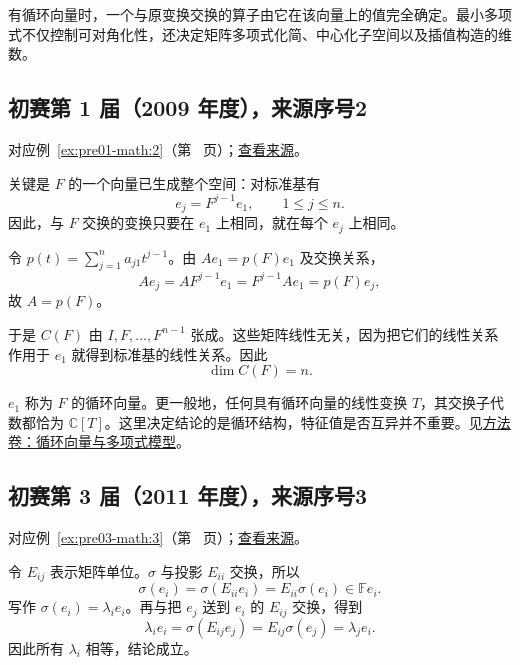 \documentclass[UTF8,12pt,a4paper,fontset=fandol]{ctexart}
\begin{document}
\label{sec:solutions-5}

有循环向量时，一个与原变换交换的算子由它在该向量上的值完全确定。最小多项式不仅控制可对角化性，还决定矩阵多项式化简、中心化子空间以及插值构造的维数。

\subsection{初赛第 1 届（2009 年度），来源序号2}\label{ans:pre01-math:2}\label{pr:pre01-math:2}

对应例~\ref{ex:pre01-math:2}（第~\pageref{ex:pre01-math:2} 页）；\href{https://github.com/lzxcr/cmc-mathematics/blob/64916fa1fdbc3e444a652eca204d5669058ee321/src/problems/preliminary/01/02.md}{查看来源}。

\begin{solve}

关键是 $F$ 的一个向量已生成整个空间：对标准基有
\[
e_j=F^{j-1}e_1,\qquad 1\le j\le n.
\]
因此，与 $F$ 交换的变换只要在 $e_1$ 上相同，就在每个 $e_j$ 上相同。

令 $p(t)=\sum_{j=1}^n a_{j1}t^{j-1}$。由 $Ae_1=p(F)e_1$ 及交换关系，
\[
Ae_j=AF^{j-1}e_1=F^{j-1}Ae_1=p(F)e_j,
\]
故 $A=p(F)$。

于是 $C(F)$ 由 $I,F,\ldots,F^{n-1}$ 张成。这些矩阵线性无关，因为把它们的线性关系作用于 $e_1$ 就得到标准基的线性关系。因此
\[
\boxed{\dim C(F)=n.}
\]

\end{solve}

\begin{remark}[方法与条件]

$e_1$ 称为 $F$ 的循环向量。更一般地，任何具有循环向量的线性变换 $T$，其交换子代数都恰为 $\mathbb C[T]$。这里决定结论的是循环结构，特征值是否互异并不重要。见\hyperref[app:linear-cyclic]{方法卷：循环向量与多项式模型}。

\end{remark}

\subsection{初赛第 3 届（2011 年度），来源序号3}\label{ans:pre03-math:3}\label{pr:pre03-math:3}

对应例~\ref{ex:pre03-math:3}（第~\pageref{ex:pre03-math:3} 页）；\href{https://github.com/lzxcr/cmc-mathematics/blob/64916fa1fdbc3e444a652eca204d5669058ee321/src/problems/preliminary/03/03.md}{查看来源}。

\begin{solve}

令 $E_{ij}$ 表示矩阵单位。$\sigma$ 与投影 $E_{ii}$ 交换，所以
\[
\sigma(e_i)=\sigma(E_{ii}e_i)=E_{ii}\sigma(e_i)\in\mathbb F e_i.
\]
写作 $\sigma(e_i)=\lambda_i e_i$。再与把 $e_j$ 送到 $e_i$ 的 $E_{ij}$ 交换，得到
\[
\lambda_i e_i
=\sigma(E_{ij}e_j)
=E_{ij}\sigma(e_j)
=\lambda_j e_i.
\]
因此所有 $\lambda_i$ 相等，结论成立。

\end{solve}
\end{document}
